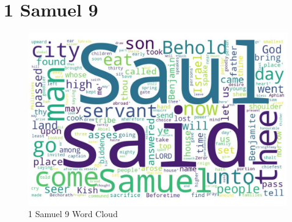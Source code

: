 \chapter{1 Samuel 9}

\begin{figure}
  \includegraphics[width=\linewidth]{09OT-1Samuel/1Samuel9-Wordcloud.jpg}
  \caption{1 Samuel 9 Word Cloud}
  \label{fig:1 Samuel 9 word Cloud}
\end{figure}


